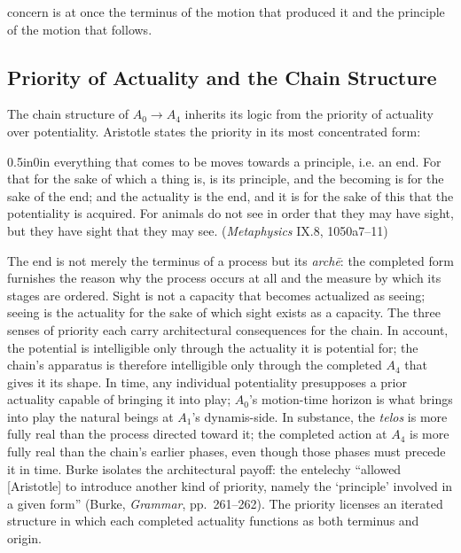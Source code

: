 concern is at once the terminus of the motion that produced it and the principle of the motion that follows.

\subsection{Priority of Actuality and the Chain Structure}

The chain structure of $A_0 \rightarrow A_4$ inherits its logic from the priority of actuality over potentiality. Aristotle states the priority in its most concentrated form:
\begin{adjustwidth}{0.5in}{0in}
everything that comes to be moves towards a principle, i.e. an end. For that for the sake of which a thing is, is its principle, and the becoming is for the sake of the end; and the actuality is the end, and it is for the sake of this that the potentiality is acquired. For animals do not see in order that they may have sight, but they have sight that they may see. (\textit{Metaphysics} IX.8, 1050a7--11)
\end{adjustwidth}
The end is not merely the terminus of a process but its \textit{archē}: the completed form furnishes the reason why the process occurs at all and the measure by which its stages are ordered. Sight is not a capacity that becomes actualized as seeing; seeing is the actuality for the sake of which sight exists as a capacity. The three senses of priority each carry architectural consequences for the chain. In account, the potential is intelligible only through the actuality it is potential for; the chain's apparatus is therefore intelligible only through the completed $A_4$ that gives it its shape. In time, any individual potentiality presupposes a prior actuality capable of bringing it into play; $A_0$'s motion-time horizon is what brings into play the natural beings at $A_1$'s dynamis-side. In substance, the \textit{telos} is more fully real than the process directed toward it; the completed action at $A_4$ is more fully real than the chain's earlier phases, even though those phases must precede it in time. Burke isolates the architectural payoff: the entelechy ``allowed [Aristotle] to introduce another kind of priority, namely the `principle' involved in a given form'' (Burke, \textit{Grammar}, pp.~261--262). The priority licenses an iterated structure in which each completed actuality functions as both terminus and origin.

